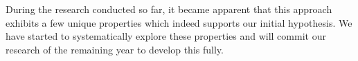 \documentclass[oneside]{book}
\begin{document}
During the research conducted so far, it became apparent that this approach exhibits a few unique properties which indeed supports our initial hypothesis. We have started to systematically explore these properties and will commit our research of the remaining year to develop this fully.

\clearpage
\tableofcontents
\clearpage















\renewcommand\bibname{References}





\end{document}
